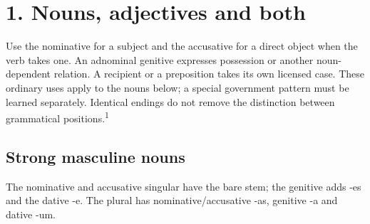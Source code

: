 \section*{1. Nouns, adjectives and both}

Use the nominative for a subject and the accusative for a direct object when the verb takes one. An adnominal genitive expresses possession or another noun-dependent relation. A recipient or a preposition takes its own licensed case. These ordinary uses apply to the nouns below; a special government pattern must be learned separately. Identical endings do not remove the distinction between grammatical positions.\textsuperscript{1}

\subsection*{Strong masculine nouns}

The nominative and accusative singular have the bare stem; the genitive adds -es and the dative -e. The plural has nominative/\allowbreak{}accusative -as, genitive -a and dative -um.

